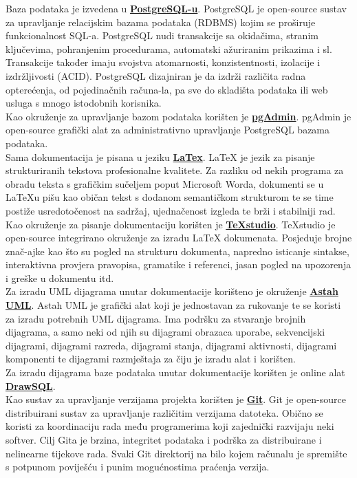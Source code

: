 			Baza podataka je izvedena u \textbf{\href{https://www.postgresql.org/}{PostgreSQL-u}}. PostgreSQL je open-source sustav za upravljanje relacijskim bazama podataka (RDBMS) kojim se proširuje funkcionalnost SQL-a. PostgreSQL nudi transakcije sa okidačima, stranim ključevima, pohranjenim procedurama, automatski ažuriranim prikazima i sl. Transakcije također imaju svojstva atomarnosti, konzistentnosti, izolacije i izdržljivosti (ACID). PostgreSQL dizajniran je da izdrži različita radna opterećenja, od pojedinačnih računa-la, pa sve do skladišta podataka ili web usluga s mnogo istodobnih korisnika. \\
			Kao okruženje za upravljanje bazom podataka korišten je \textbf{\href{https://www.pgadmin.org/}{pgAdmin}}. pgAdmin je open-source grafički alat za administrativno upravljanje PostgreSQL bazama podataka.\\
			Sama dokumentacija je pisana u jeziku \textbf{\href{https://www.latex-project.org/}{LaTex}}. LaTeX je jezik za pisanje strukturiranih tekstova profesionalne kvalitete. Za razliku od nekih programa za obradu teksta s grafičkim sučeljem poput Microsoft Worda, dokumenti se u LaTeXu pišu kao običan tekst s dodanom semantičkom strukturom te se time postiže usredotočenost na sadržaj, ujednačenost izgleda te brži i stabilniji rad.\\
			Kao okruženje za pisanje dokumentaciju korišten je \textbf{\href{https://www.texstudio.org/}{TeXstudio}}. TeXstudio je open-source integrirano okruženje za izradu LaTeX dokumenata. Posjeduje brojne znač-ajke kao što su pogled na strukturu dokumenta, napredno isticanje sintakse, interaktivna provjera pravopisa, gramatike i referenci, jasan pogled na upozorenja i greške u dokumentu itd.\\
			Za izradu UML dijagrama unutar dokumentacije korišteno je okruženje \textbf{\href{https://astah.net/products/astah-uml/}{Astah UML}}. Astah UML je grafički alat koji je jednostavan za rukovanje te se koristi za izradu potrebnih UML dijagrama. Ima podršku za stvaranje brojnih dijagrama, a samo neki od njih su dijagrami obrazaca uporabe, sekvencijski dijagrami, dijagrami razreda, dijagrami stanja, dijagrami aktivnosti, dijagrami komponenti te dijagrami razmještaja za čiju je izradu alat i korišten.\\
			Za izradu dijagrama baze podataka unutar dokumentacije korišten je online alat \textbf{\href{https://drawsql.app/}{DrawSQL}}.\\
			Kao sustav za upravljanje verzijama projekta korišten je \textbf{\href{https://git-scm.com/}{Git}}. Git je open-source distribuirani sustav za upravljanje različitim verzijama datoteka. Obično se koristi za koordinaciju rada među programerima koji zajednički razvijaju neki softver. Cilj Gita je brzina, integritet podataka i podrška za distribuirane i nelinearne tijekove rada. Svaki Git direktorij na bilo kojem računalu je spremište s potpunom poviješću i punim mogućnostima praćenja verzija.\\
